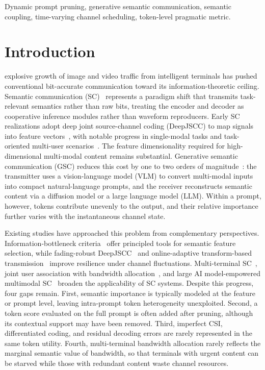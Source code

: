 \documentclass[journal]{IEEEtran}
\begin{document}
\begin{IEEEkeywords}
Dynamic prompt pruning, generative semantic communication, semantic coupling, time-varying channel scheduling, token-level pragmatic metric.
\end{IEEEkeywords}

\section{Introduction}
 explosive growth of image and video traffic from intelligent terminals has pushed conventional bit-accurate communication toward its information-theoretic ceiling. Semantic communication (SC)~\cite{gunduz2023beyond} represents a paradigm shift that transmits task-relevant semantics rather than raw bits, treating the encoder and decoder as cooperative inference modules rather than waveform reproducers. Early SC realizations adopt deep joint source-channel coding (DeepJSCC) to map signals into feature vectors~\cite{bourtsoulatze2019deep}, with notable progress in single-modal tasks and task-oriented multi-user scenarios~\cite{xie2021task}. The feature dimensionality required for high-dimensional multi-modal content remains substantial. Generative semantic communication (GSC) reduces this cost by one to two orders of magnitude~\cite{Qiao2024latency,ren2025generative}: the transmitter uses a vision-language model (VLM) to convert multi-modal inputs into compact natural-language prompts, and the receiver reconstructs semantic content via a diffusion model or a large language model (LLM). Within a prompt, however, tokens contribute unevenly to the output, and their relative importance further varies with the instantaneous channel state.

Existing studies have approached this problem from complementary perspectives. Information-bottleneck criteria~\cite{shao2021learning} offer principled tools for semantic feature selection, while fading-robust DeepJSCC~\cite{Yang2022ofdm} and online-adaptive transform-based transmission~\cite{daiTowardAdaptive} improve resilience under channel fluctuations. Multi-terminal SC~\cite{yang2025rethinking}, joint user association with bandwidth allocation~\cite{xia2023joint}, and large AI model-empowered multimodal SC~\cite{jiang2025large} broaden the applicability of SC systems. Despite this progress, four gaps remain. First, semantic importance is typically modeled at the feature or prompt level, leaving intra-prompt token heterogeneity unexploited. Second, a token score evaluated on the full prompt is often added after pruning, although its contextual support may have been removed. Third, imperfect CSI, differentiated coding, and residual decoding errors are rarely represented in the same token utility. Fourth, multi-terminal bandwidth allocation rarely reflects the marginal semantic value of bandwidth, so that terminals with urgent content can be starved while those with redundant content waste channel resources.
\end{document}
